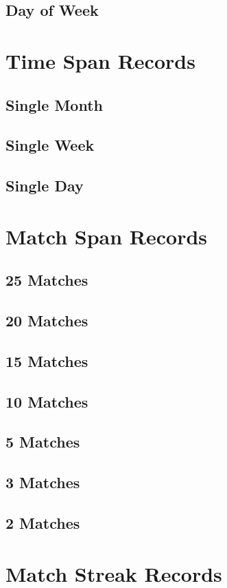 \documentclass[a4paper,twoside,titlepage]{book}
\begin{document}
      \section{Day of Week}
    \chapter{Time Span Records}
      \section{Single Month}
      \section{Single Week}
      \section{Single Day}
    \chapter{Match Span Records}
      \section{25 Matches}
      \section{20 Matches}
      \section{15 Matches}
      \section{10 Matches}
      \section{5 Matches}
      \section{3 Matches}
      \section{2 Matches}
    \chapter{Match Streak Records}
\end{document}
